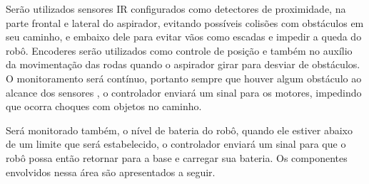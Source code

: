 			Serão utilizados sensores IR configurados como detectores de proximidade, na parte frontal  e lateral do aspirador, evitando possíveis colisões com obstáculos em seu caminho, e embaixo dele para evitar vãos como escadas e impedir a queda do robô. Encoderes serão utilizados como controle de posição e também no auxílio da movimentação das rodas quando o aspirador girar para desviar de obstáculos. O monitoramento será contínuo, portanto sempre que houver algum obstáculo ao alcance dos sensores , o controlador enviará um sinal para os motores, impedindo que ocorra choques com objetos no caminho. 

			Será monitorado também, o nível de bateria do robô, quando ele estiver abaixo de um limite que será estabelecido, o controlador enviará um sinal para que o robô possa então retornar para a base e carregar sua bateria. Os componentes envolvidos nessa área são apresentados a seguir.

